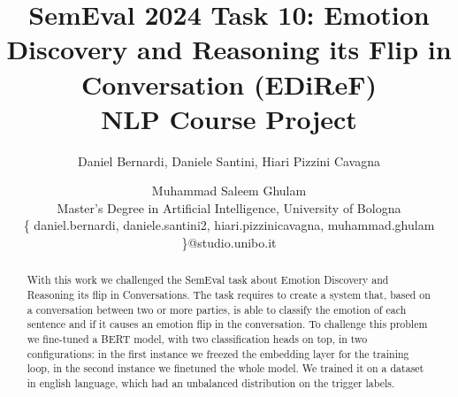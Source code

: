 \documentclass[11pt]{article}
\begin{document}
%
\title{SemEval 2024 Task 10: Emotion Discovery and Reasoning its Flip in Conversation (EDiReF)\\
\large {}
NLP Course Project
}
\author{
    Daniel Bernardi,
    Daniele Santini,
    Hiari Pizzini Cavagna
    \and
    Muhammad Saleem Ghulam\\
Master's Degree in Artificial Intelligence, University of Bologna\\
\{ daniel.bernardi, daniele.santini2, hiari.pizzinicavagna, muhammad.ghulam \}@studio.unibo.it
}
\maketitle



\begin{abstract}
With this work we challenged the SemEval task about Emotion Discovery and Reasoning its flip in Conversations. The task requires to create a system that, based on a conversation between two or more parties, is able to classify the emotion of each sentence and if it causes an emotion flip in the conversation. To challenge this problem we fine-tuned a BERT model, with two classification heads on top, in two configurations: in the first instance we freezed the embedding layer for the training loop, in the second instance we finetuned the whole model. We trained it on a dataset in english language, which had an unbalanced distribution on the trigger labels.



\end{abstract}
\end{document}
